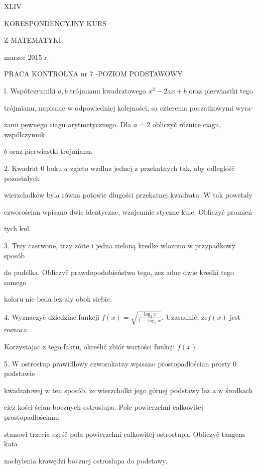 \documentclass[a4paper,12pt]{article}
\begin{document}
XLIV

KORESPONDENCYJNY KURS

Z MATEMATYKI

marzec 2015 r.

PRACA KONTROLNA nr 7 -POZIOM PODSTAWOWY

l. Wspótczynniki $a, b$ trójmianu kwadratowego $x^{2} -2ax+b$ oraz pierwiastki tego

trójmianu, napisane $\mathrm{w}$ odpowiedniej kolejności, sa czterema poczatkowymi wyra-

zami pewnego ciagu arytmetycznego. Dla $a=2$ obliczyč róznice ciagu, wspólczynnik

$b$ oraz pierwiastki trójmianu.

2. Kwadrat $0$ boku $a$ zgieto wzdluz jednej $\mathrm{z}$ przekatnych $\mathrm{t}\mathrm{a}\mathrm{k}$, aby odleglośč pozostalych

wierzcholków byla równa potowie dlugości przekatnej kwadratu. $\mathrm{W}$ tak powstaly

czworościan wpisano dwie identyczne, wzajemnie styczne kule. Obliczyč promień

tych $\mathrm{k}\mathrm{u}\mathrm{l}.$

3. Trzy czerwone, trzy zóite $\mathrm{i}$ jedna zieloną kredke wlozono $\mathrm{w}$ przypadkowy sposób

do pudelka. Obliczyč prawdopodobieństwo tego, $\dot{\mathrm{z}}\mathrm{e}\dot{\mathrm{z}}$ adne dwie kredki tego samego

koloru nie beda $\mathrm{l}\mathrm{e}\dot{\mathrm{z}}$ aly obok siebie.

4. Wyznaczyč dziedzine funkcji $f(x)=\sqrt{\frac{\log_{2}x}{1-\log_{2}x}}$. Uzasadnič, $\dot{\mathrm{z}}\mathrm{e}f(x)$ jest rosnaca.

Korzystajac $\mathrm{z}$ tego faktu, określič zbiór wartości funkcji $f(x).$

5. $\mathrm{W}$ ostrostup prawidIowy czworokatny wpisano prostopadlościan prosty $0$ podstawie

kwadratowej $\mathrm{w}$ ten sposób, $\dot{\mathrm{z}}\mathrm{e}$ wierzcholki jego górnej podstawy $\mathrm{l}\mathrm{e}\dot{\mathrm{z}}$ a $\mathrm{w}$ środkach

$\mathrm{c}\mathrm{i}\mathrm{e}\dot{\mathrm{z}}$ kości ścian bocznych ostroslupa. Pole powierzchni calkowitej prostopadlościanu

stanowi trzecia cześč pola powierzchni calkowitej ostrostupa. Obliczyč tangens kata

nachylenia krawędzi bocznej ostroslupa do podstawy.
\end{document}

